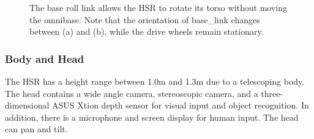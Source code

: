 \documentclass[12pt]{article}
\begin{document}
            \begin{figure}[ht]
                \centering
                \quad
                \caption{The base roll link allows the HSR to rotate its torso without moving the omnibase. Note that the orientation of base\_link changes between (a) and (b), while the drive wheels remain stationary.}
                \label{fig:base_roll_fig}
            \end{figure}
            
        \subsubsection{Body and Head} 
            The HSR has a height range between 1.0m and 1.3m due to a telescoping body. The head contains a wide angle camera, stereoscopic camera, and a three-dimensional ASUS Xtion depth sensor for visual input and object recognition. In addition, there is a microphone and screen display for human input. The head can pan and tilt.
\end{document}
